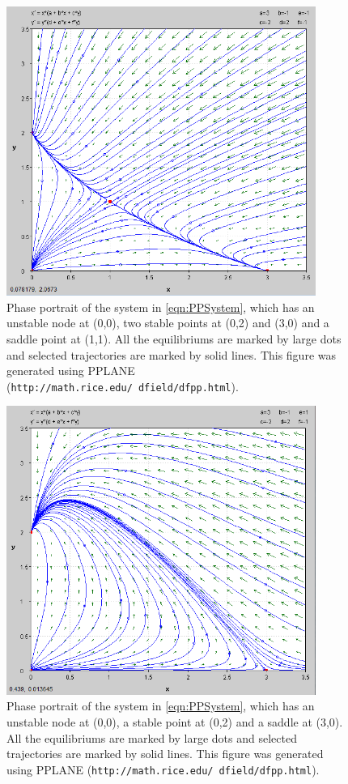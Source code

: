 \documentclass[a4paper,twocolumn]{article} %
\begin{document}
\clearpage %
\begin{figure}[p] %
  \begin{center}
    \includegraphics[width = 0.9\textwidth, height = 0.5\textwidth]{-2-1}
  \end{center}
  \caption{Phase portrait of the system in \eqref{eqn:PPSystem}, which has an unstable node at \mbox{(0,0)}, two stable points at \mbox{(0,2)} and \mbox{(3,0)} and a saddle point at \mbox{(1,1)}. All the equilibriums are marked by large dots and selected trajectories are marked by solid lines. This figure was generated using PPLANE (\texttt{http://math.rice.edu/~dfield/dfpp.html}).}
  \label{fig:pplane}
\end{figure}

\begin{figure}[p] %
  \begin{center}
    \includegraphics[width = 0.9\textwidth, height = 0.5\textwidth]{-21}
  \end{center}
  \caption{Phase portrait of the system in \eqref{eqn:PPSystem}, which has an unstable node at \mbox{(0,0)}, a stable point at \mbox{(0,2)} and a saddle at \mbox{(3,0)}. All the equilibriums are marked by large dots and selected trajectories are marked by solid lines. This figure was generated using PPLANE (\texttt{http://math.rice.edu/~dfield/dfpp.html}).}
  \label{fig:pplane2}
\end{figure}
\end{document}
